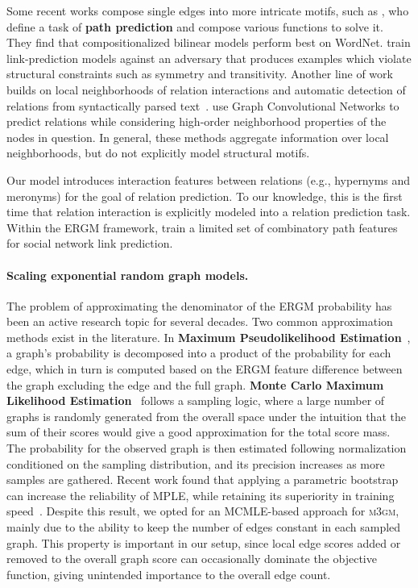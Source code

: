 \documentclass[11pt,twocolumn]{article}
\newcommand{\WN}[0]{WordNet}
\newcommand{\ergm}[0]{ERGM}
\newcommand{\sysname}[0]{\textsc{m3gm}}
\begin{document}
Some recent works compose single edges into more intricate motifs, such as ,
who define a task of \textbf{path prediction}
and compose various functions to solve it.
They find that compositionalized bilinear models perform best on \WN{}.
 train link-prediction models against an adversary that produces examples which violate structural constraints such as symmetry and transitivity.
Another line of work builds on local neighborhoods of relation interactions and automatic detection of relations from syntactically parsed text~\cite{riedel2013relation,toutanova2015representing}.
 use Graph Convolutional Networks to predict relations while considering high-order neighborhood properties of the nodes in question.
In general, these methods aggregate information over local neighborhoods, but do not explicitly model structural motifs.

Our model introduces interaction features between relations (e.g., hypernyms and meronyms) for the goal of relation prediction.
To our knowledge, this is the first time that relation interaction is explicitly modeled into a relation prediction task.
Within the \ergm{} framework,  train a limited set of combinatory path features for social network link prediction.

\paragraph{Scaling exponential random graph models.} The problem of approximating the denominator of the \ergm{} probability has been an active research topic for several decades.
Two common approximation methods exist in the literature.
In \textbf{Maximum Pseudolikelihood Estimation}~\cite[\textbf{MPLE};][]{strauss1990pseudolikelihood}, a graph's probability is decomposed into a product of the probability for each edge, which in turn is computed based on the \ergm{} feature difference between the graph excluding the edge and the full graph.
\textbf{Monte Carlo Maximum Likelihood Estimation}~\cite[\textbf{MCMLE};][]{snijders2002markov} follows a sampling logic, where a large number of graphs is randomly generated from the overall space under the intuition that the sum of their scores would give a good approximation for the total score mass.
The probability for the observed graph is then estimated following normalization conditioned on the sampling distribution, and its precision increases as more samples are gathered.
Recent work found that applying a parametric bootstrap can increase the reliability of MPLE, while retaining its superiority in training speed~\cite{schmid2017exponential}.
Despite this result, we opted for an MCMLE-based approach for \sysname{}, mainly due to the ability to keep the number of edges constant in each sampled graph.
This property is important in our setup, since local edge scores added or removed to the overall graph score can occasionally dominate the objective function, giving unintended importance to the overall edge count.
\end{document}
